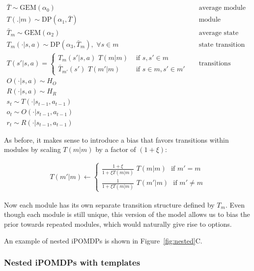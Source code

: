 \documentclass[11pt]{article}
\begin{document}
\begin{align*}
\bar{T} \sim \text{GEM}(\alpha_0)      		&& \text{average module transition distribution}  \\
T(.|m) \sim \text{DP}(\alpha_1, \bar{T})      		&& \text{module transition distributions} \\
\bar{T}_{m} \sim \text{GEM}(\alpha_2)      		&& \text{average state transition distributions} \\
T_m(\cdot|s,a) \sim \text{DP}(\alpha_3, \bar{T}_m) ,\,\,\forall s \in m      		&& \text{state transition distributions} \\
T(s'|s,a) = \begin{cases}  T_m(s'|s,a) \,\, T(m|m) & \text{ if } s, s' \in m \\  \bar{T}_{m'}(s') \,\, T(m'|m) & \text{ if } s \in m, s' \in m'  \end{cases}			&& \text{transitions between all states} \\
O(\cdot | s,a) \sim H_O \\
R(\cdot | s,a) \sim H_R \\
s_t \sim T(\cdot | s_{t-1},a_{t-1}) \\
o_t \sim O(\cdot | s_{t-1}, a_{t-1}) \\
r_t \sim R(\cdot | s_{t-1}, a_{t-1}) 
\end{align*}

As before, it makes sense to introduce a bias that favors transitions within modules by scaling $T(m|m)$ by a factor of $(1 + \xi)$:

\begin{align*}
T(m'|m) \leftarrow \begin{cases}  \frac{1 + \xi}{1 + \xi T(m|m)} \,\, T(m|m) \,\,\text{ if }m' = m    \\  \frac{1}{1 + \xi T(m|m)} \,\, T(m'|m)\,\,\text{ if }m' \ne m  \end{cases}
\end{align*}

Now each module has its own separate transition structure defined by $T_m$. Even though each module is still unique, this version of the model allows us to bias the prior towards repeated modules, which would naturally give rise to options.

An example of nested iPOMDPs is shown in Figure~\ref{fig:nested}C.

\subsubsection{Nested iPOMDPs with templates}
\end{document}
